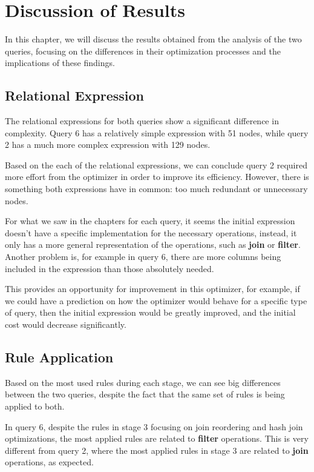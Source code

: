 \documentclass[a4paper,12pt]{scrreprt}
\begin{document}
\chapter{Discussion of Results} \label{chap:discussion}
\thispagestyle{fancy}

In this chapter, we will discuss the results obtained from the analysis of the two queries, focusing on the differences in their optimization processes and the implications of these findings.

\section{Relational Expression}
The relational expressions for both queries show a significant difference in complexity. Query 6 has a relatively simple expression with 51 nodes, while query 2 has a much more complex expression with 129 nodes.

Based on the each of the relational expressions, we can conclude query 2 required more effort from the optimizer in order to improve its efficiency. However, there is something both expressions have in common: too much redundant or unnecessary nodes.

For what we saw in the chapters for each query, it seems the initial expression doesn't have a specific implementation for the necessary operations, instead, it only has a more general representation of the operations, such as \textbf{join} or \textbf{filter}. Another problem is, for example in query 6, there are more columns being included in the expression than those absolutely needed.

This provides an opportunity for improvement in this optimizer, for example, if we could have a prediction on how the optimizer would behave for a specific type of query, then the initial expression would be greatly improved, and the initial cost would decrease significantly.

\section{Rule Application}   

Based on the most used rules during each stage, we can see big differences between the two queries, despite the fact that the same set of rules is being applied to both.

In query 6, despite the rules in stage 3 focusing on join reordering and hash join optimizations, the most applied rules are related to \textbf{filter} operations.
This is very different from query 2, where the most applied rules in stage 3 are related to \textbf{join} operations, as expected.
\end{document}
